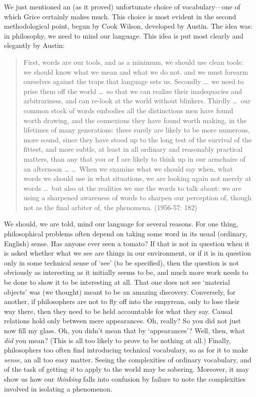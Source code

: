 We just mentioned an (as it proved) unfortunate choice of vocabulary---one of which Grice certainly makes much. This choice is most evident in the second methodological point, begun by Cook Wilson, developed by Austin. The idea was: in philosophy, we need to mind our language. This idea is put most clearly and elegantly by Austin:
\begin{quotation}
	First, words are our tools, and as a minimum, we should use clean tools: we should know what we mean and what we do not. and we must forearm ourselves against the traps that language sets us. Secondly \ldots\ we need to prise them off the world \ldots\ so that we can realize their inadequacies and arbitrariness, and can re-look at the world without blinkers. Thirdly \ldots\ our common stock of words embodies all the distinctions men have found worth drawing, and the connexions they have found worth making, in the lifetimes of many generations: these surely are likely to be more numerous, more sound, since they have stood up to the long test of the survival of the fittest, and more subtle, at least in all ordinary and reasonably practical matters, than any that you or I are likely to think up in our armchairs of an afternoon \ldots
	\ldots\ When we examine what we should say when, what words we should use in what situations, we are looking again not merely at words \ldots\ but also at the realities we use the words to talk about: we are using a sharpened awareness of words to sharpen our perception of, though not as the final arbiter of, the phenomena. (1956-57: 182)
\end{quotation}
We should, we are told, mind our language for several reasons. For one thing, philosophical problems often depend on taking some word in its usual (ordinary, English) sense. Has anyone ever seen a tomato? If that is not in question when it is asked whether what we see are things in our environment, or if it is in question only in some technical sense of ‘see’ (to be specified), then the question is not obviously as interesting as it initially seems to be, and much more work needs to be done to show it to be interesting at all. That one does not see `material objects' was (we thought) meant to be an amazing discovery. Conversely, for another, if philosophers are not to fly off into the empyrean, only to lose their way there, then they need to be held accountable for what they say. Causal relations hold only between mere appearances. Oh, really? So you did not just now fill my glass. Oh, you didn’t mean that by `appearances'? Well, then, what \emph{did} you mean? (This is all too likely to prove to be nothing at all.) Finally, philosophers too often find introducing technical vocabulary, so as for it to make \emph{sense}, an all too easy matter. Seeing the complexities of ordinary vocabulary, and of the task of getting \emph{it} to apply to the world may be sobering. Moreover, it may show us how our \emph{thinking} falls into confusion by failure to note the complexities involved in isolating a phenomenon.

